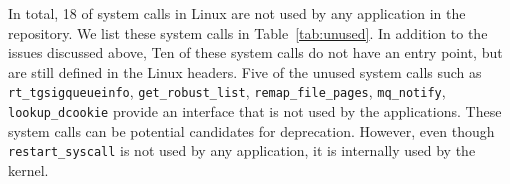 In total, 18 of \syscallnum{} system calls in Linux  are not used by any application in the \osdist{} repository. We list these system calls in Table~\ref{tab:unused}.
In addition to the issues discussed above,
Ten of these system calls do not have an entry point, but are still defined in the Linux headers.
Five of the unused system calls such as {\tt rt\_tgsig\linebreak[0]queueinfo}, {\tt get\_robust\_list}, {\tt remap\_\linebreak[0]file\_pages}, {\tt mq\_notify}, {\tt lookup\_dcookie} provide an interface that is not used by the applications. These system calls can be potential candidates for deprecation.
However, even though {\tt restart\_\linebreak[0]syscall} is not used by any application, it is internally used by the kernel. %


